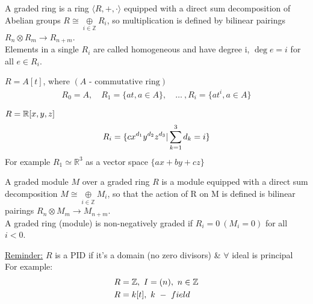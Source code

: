 \documentclass[11pt,a4paper]{report}
\begin{document}
              A graded ring is a ring $\langle R, +, \cdot \rangle$ equipped with a direct sum decomposition of Abelian
              groups $R \cong \underset{i \in \mathbb{Z}}{\oplus} R_i$, so multiplication is defined by bilinear pairings $R_n \otimes R_m \rightarrow R_{n+m}$. \\
              
              Elements in a single $R_i$ are called homogeneous and have degree i, $\deg e = i$ for all $e \in R_i$.
              
              \begin{Ex}
                $ R = A[t]$, where  $(A \textrm{ - commutative ring})$
              \begin{align*}
                R_0 = A, \quad R_1 = \{at, a \in A\}, \quad \dots \ , R_i = \{at^i, a \in A\}
              \end{align*}
              \end{Ex}
              \begin{Ex}
                $R = \mathbb{R}[x,y,z]$ 
                \[
                R_i = \{cx^{d_{1}}y^{d_{2}}z^{d_{3}} | \sum^3_{k=1}d_k = i\}\\
                \]
              For example $R_1 \simeq \mathbb{R}^3$ as a vector space $\{ax + by + cz\}$\\
              \end{Ex}
              
              
               A graded module $M$ over a graded ring $R$ is a module equipped with a direct sum decomposition $M \cong \underset{i \in \mathbb{Z}}{\oplus} M_i$, so that the action of R on M is defined is bilinear pairings $R_n \otimes M_m \rightarrow M_{n+m}$. \\
              
              A graded ring (module) is non-negatively graded if $R_i = 0 \ (M_i = 0)$ for all $i < 0$.
              
              \underline{Reminder:} $R$ is a PID if it's a domain (no zero divisors) \& $\forall$ ideal is principal\\
              
             For example: 
              \begin{align*}
                &R = \mathbb{Z}, \ I = (n),\ n \in \mathbb{Z} \\
                &R = k[t],\ k\ -\ field\\
              \end{align*}
              
\end{document}
